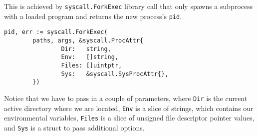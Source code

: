 \documentclass[12pt]{article}
\begin{document}
This is achieved by \texttt{syscall.ForkExec} library call that only spawns a
subprocess with a loaded program and returns the new process's \texttt{pid}.
\begin{verbatim}
pid, err := syscall.ForkExec(
        paths, args, &syscall.ProcAttr{
                Dir:   string,
                Env:   []string,
                Files: []uintptr,
                Sys:   &syscall.SysProcAttr{},
        })
\end{verbatim}
Notice that we have to pass in a couple of parameters, where \texttt{Dir} is the
current active directory where we are located, \texttt{Env} is a slice of strings, which
contains our environmental variables, \texttt{Files} is a slice of unsigned file
descriptor pointer values, and \texttt{Sys} is a struct to pass additional options.
\end{document}
